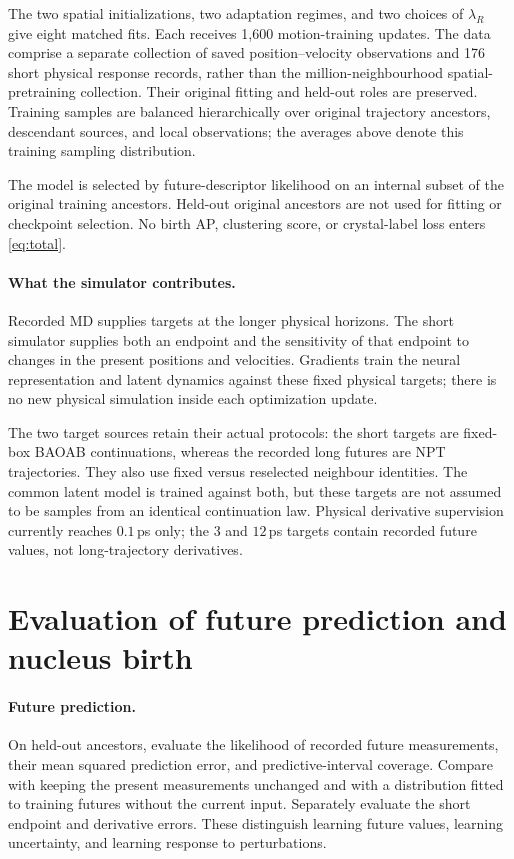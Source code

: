 \documentclass[11pt,a4paper]{article}
\begin{document}
The two spatial initializations, two adaptation regimes, and two choices of
$\lambda_R$ give eight matched fits. Each receives 1,600 motion-training updates.
The data comprise a separate collection of saved position--velocity observations
and 176 short physical response records, rather than the million-neighbourhood
spatial-pretraining collection. Their original fitting and held-out roles are
preserved. Training samples are balanced hierarchically
over original trajectory ancestors, descendant sources, and local observations;
the averages above denote this training sampling distribution.

The model is selected by future-descriptor likelihood on an internal subset of
the original training ancestors. Held-out original ancestors are not used for
fitting or checkpoint selection. No birth AP, clustering score, or crystal-label
loss enters \eqref{eq:total}.

\paragraph{What the simulator contributes.}
Recorded MD supplies targets at the longer physical horizons. The short
simulator supplies both an endpoint and the sensitivity of that endpoint to
changes in the present positions and velocities. Gradients train the neural
representation and latent dynamics against these fixed physical targets;
there is no new physical simulation inside each optimization update.

The two target sources retain their actual protocols: the short targets are
fixed-box BAOAB continuations, whereas the recorded long futures are NPT
trajectories. They also use fixed versus reselected neighbour identities.
The common latent model is trained against both, but these targets are not
assumed to be samples from an identical continuation law. Physical derivative
supervision currently reaches $0.1$\,ps only; the $3$ and $12$\,ps targets contain
recorded future values, not long-trajectory derivatives.

\section{Evaluation of future prediction and nucleus birth}

\paragraph{Future prediction.}
On held-out ancestors, evaluate the likelihood of recorded future measurements,
their mean squared prediction error, and predictive-interval coverage. Compare
with keeping the present measurements unchanged and with a distribution fitted
to training futures without the current input. Separately evaluate the short
endpoint and derivative errors. These distinguish learning future values,
learning uncertainty, and learning response to perturbations.
\end{document}
